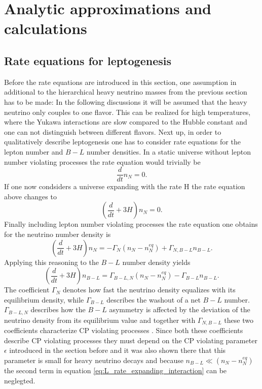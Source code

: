  \chapter{Analytic approximations and calculations}
\section{Rate equations for leptogenesis}
Before the rate equations are introduced in this section, one assumption in additional to the  hierarchical heavy neutrino masses from the previous section has to be made: In the following discussions it will be assumed that the heavy neutrino only couples to one flavor. This can be realized for high temperatures, where the Yukawa interactions are slow compared to the Hubble constant and one can not distinguish between different flavors. \cite[p. 15 f.]{Wormann:2016yyi}\newline\indent 
Next up, in order to qualitatively describe leptogenesis one has to consider rate equations for the lepton number and $B-L$ number densities. In a static universe without lepton number violating processes the rate equation would trivially be
\begin{equation}
	\frac{d}{dt}n_N=0.
	\label{eq:rate_static_nointeraction}
\end{equation}
If one now condsiders a universe expanding with the rate H the rate equation above changes to
\begin{equation}
\left(\frac{d}{dt}+3H\right)n_N=0.
\label{eq:rate_expanding_nointeraction}
\end{equation}
Finally including lepton number violating processes the rate equation one obtains for the neutrino number density is\cite[Eq. 2]{Bodeker:2013qaa}
\begin{equation}
\left(\frac{d}{dt}+3H\right)n_N=-\Gamma_N\left(n_N-n_N^{eq}\right)+\Gamma_{N,B-L}n_{B-L}.
\label{eq:L_rate_expanding_interaction}
\end{equation}
Applying this reasoning to the $B-L$ number density yields\cite[Eq. 3]{Bodeker:2013qaa}
\begin{equation}
\left(\frac{d}{dt}+3H\right)n_{B-L}=\Gamma_{B-L,N}\left(n_N-n_N^{eq}\right)-\Gamma_{B-L}n_{B-L}.
\label{eq:B-L_rate_expanding_interaction}
\end{equation}
The coefficient $\Gamma_N$ denotes how fast the neutrino density equalizes with its equilibrium density, while $\Gamma_{B-L}$ describes the washout of a net $B-L$ number. $\Gamma_{B-L,N}$ describes how the $B-L$ asymmetry is affected by the deviation of the neutrino density from its equilibrium value and together with $\Gamma_{N,B-L}$ these two coefficients characterize CP violating processes \cite[p. 4]{Bodeker:2013qaa}. Since both these coefficients describe CP violating processes they must depend on the CP violating parameter $\epsilon$ introduced in the section before and it was also shown there that this parameter is small for heavy neutrino decays and because $n_{B-L}\ll\left(n_N-n_N^{eq}\right)$ the second term in equation \eqref{eq:L_rate_expanding_interaction} can be neglegted. \newline\indent
